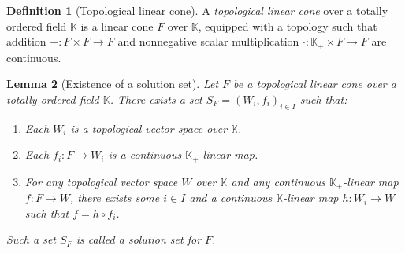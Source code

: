 \documentclass[a4paper,11pt]{article}
\numberwithin{equation}{section}
\theoremstyle{definition}
\newtheorem{Definition}{Definition}[section]
\theoremstyle{plain}
\newtheorem{Lemma}[Definition]{Lemma}
\begin{document}
\begin{Definition}[Topological linear cone]
A \textit{topological linear cone} over a totally ordered field $\mathbb{K}$ is a linear cone $F$ over $\mathbb{K}$, equipped with a topology such that addition $+:F \times F \to F$ and nonnegative scalar multiplication $\cdot: \mathbb{K}_{+} \times F \to F$ are continuous.
\end{Definition}

\begin{Lemma}[Existence of a solution set]\label{Lemma: existence of solution set}
    Let $F$ be a topological linear cone over a totally ordered field $\mathbb{K}$. There exists a set $S_{F} = (W_{i}, f_{i})_{i \in I}$ such that:
    \begin{enumerate}
        \item Each $W_{i}$ is a topological vector space over $\mathbb{K}$.
        \item Each $f_{i}: F \longrightarrow W_{i}$ is a continuous $\mathbb{K}_{+}$-linear map.
        \item For any topological vector space $W$ over $\mathbb{K}$ and any continuous $\mathbb{K}_{+}$-linear map $f: F \longrightarrow W$, there exists some $i \in I$ and a continuous $\mathbb{K}$-linear map $h: W_{i} \longrightarrow W$ such that $f = h \circ f_{i}$.
    \end{enumerate}
    Such a set $S_{F}$ is called a \textit{solution set} for $F$.
\end{Lemma}
\end{document}

